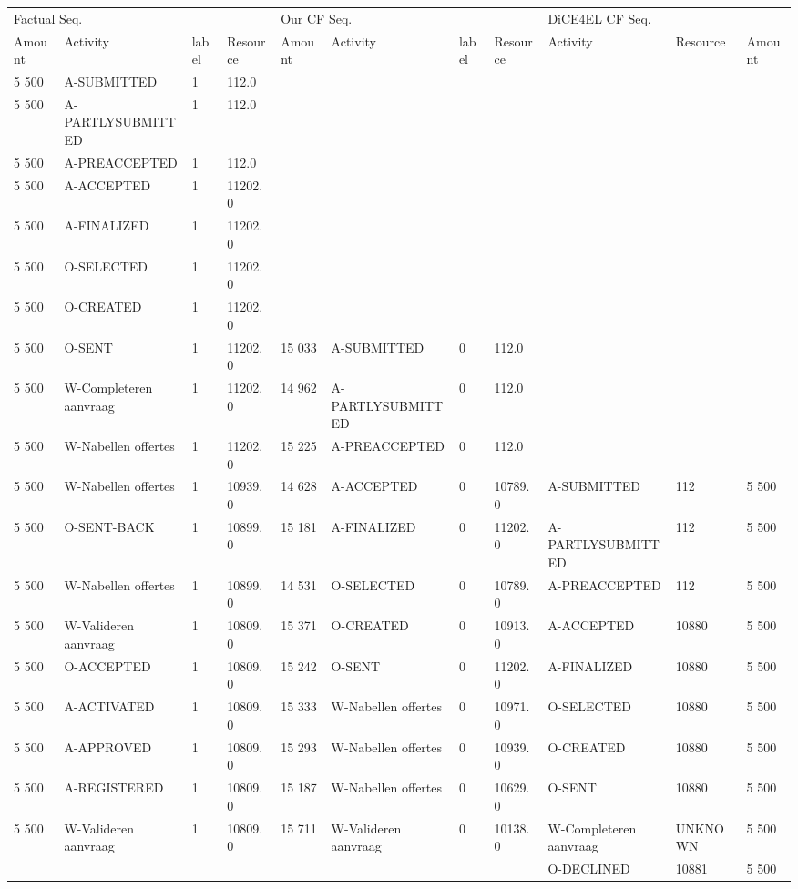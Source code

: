 \begin{tabular}{lllllllllll}
\toprule
\multicolumn{4}{l}{Factual Seq.} & \multicolumn{4}{l}{Our CF Seq.} & \multicolumn{3}{l}{DiCE4EL CF Seq.} \\
Amount & Activity & label & Resource & Amount & Activity & label & Resource & Activity & Resource & Amount \\
\midrule
5 500 & A-SUBMITTED & 1 & 112.0 &  &  &  &  &  &  &  \\
5 500 & A-PARTLYSUBMITTED & 1 & 112.0 &  &  &  &  &  &  &  \\
5 500 & A-PREACCEPTED & 1 & 112.0 &  &  &  &  &  &  &  \\
5 500 & A-ACCEPTED & 1 & 11202.0 &  &  &  &  &  &  &  \\
5 500 & A-FINALIZED & 1 & 11202.0 &  &  &  &  &  &  &  \\
5 500 & O-SELECTED & 1 & 11202.0 &  &  &  &  &  &  &  \\
5 500 & O-CREATED & 1 & 11202.0 &  &  &  &  &  &  &  \\
5 500 & O-SENT & 1 & 11202.0 & 15 033 & A-SUBMITTED & 0 & 112.0 &  &  &  \\
5 500 & W-Completeren aanvraag & 1 & 11202.0 & 14 962 & A-PARTLYSUBMITTED & 0 & 112.0 &  &  &  \\
5 500 & W-Nabellen offertes & 1 & 11202.0 & 15 225 & A-PREACCEPTED & 0 & 112.0 &  &  &  \\
5 500 & W-Nabellen offertes & 1 & 10939.0 & 14 628 & A-ACCEPTED & 0 & 10789.0 & A-SUBMITTED & 112 & 5 500 \\
5 500 & O-SENT-BACK & 1 & 10899.0 & 15 181 & A-FINALIZED & 0 & 11202.0 & A-PARTLYSUBMITTED & 112 & 5 500 \\
5 500 & W-Nabellen offertes & 1 & 10899.0 & 14 531 & O-SELECTED & 0 & 10789.0 & A-PREACCEPTED & 112 & 5 500 \\
5 500 & W-Valideren aanvraag & 1 & 10809.0 & 15 371 & O-CREATED & 0 & 10913.0 & A-ACCEPTED & 10880 & 5 500 \\
5 500 & O-ACCEPTED & 1 & 10809.0 & 15 242 & O-SENT & 0 & 11202.0 & A-FINALIZED & 10880 & 5 500 \\
5 500 & A-ACTIVATED & 1 & 10809.0 & 15 333 & W-Nabellen offertes & 0 & 10971.0 & O-SELECTED & 10880 & 5 500 \\
5 500 & A-APPROVED & 1 & 10809.0 & 15 293 & W-Nabellen offertes & 0 & 10939.0 & O-CREATED & 10880 & 5 500 \\
5 500 & A-REGISTERED & 1 & 10809.0 & 15 187 & W-Nabellen offertes & 0 & 10629.0 & O-SENT & 10880 & 5 500 \\
5 500 & W-Valideren aanvraag & 1 & 10809.0 & 15 711 & W-Valideren aanvraag & 0 & 10138.0 & W-Completeren aanvraag & UNKNOWN & 5 500 \\
 &  &  &  &  &  &  &  & O-DECLINED & 10881 & 5 500 \\
\bottomrule
\end{tabular}
